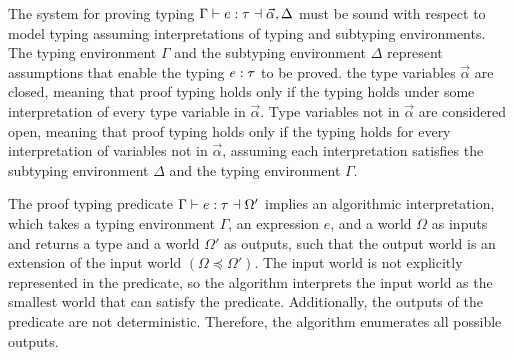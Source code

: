 \documentclass[acmsmall]{acmart}
\theoremstyle{definition}
\begin{document}
\noindent
The system for proving typing $\Gamma \vdash e : \tau \dashv \vec{\alpha}, \Delta$ 
must be sound with respect to model typing assuming 
interpretations of typing and subtyping environments.
The typing environment $\Gamma$ and the subtyping environment $\Delta$
represent assumptions that enable the typing $e : \tau$ to be proved. 
the type variables $\vec{\alpha}$ are closed, meaning that proof typing
holds only if the typing holds under some interpretation of every type variable in $\vec{\alpha}$.
Type variables not in $\vec{\alpha}$ are considered open, meaning that proof typing
holds only if the typing holds for every interpretation of variables not in $\vec{\alpha}$,
assuming each interpretation satisfies the subtyping environment $\Delta$ and the typing environment $\Gamma$.  

The proof typing predicate $\Gamma \vdash e : \tau \dashv \Omega'$
implies an algorithmic interpretation, 
which takes a typing environment $\Gamma$, an expression $e$,
and a world $\Omega$ as inputs and returns a type and a world $\Omega'$ as outputs,
such that the output world is an extension of the input world $(\Omega \preceq \Omega')$.
The input world is not explicitly represented in the predicate, so the algorithm
interprets the input world as the smallest world that can satisfy the predicate. 
Additionally, the outputs of the predicate are not deterministic. Therefore, the algorithm
enumerates all possible outputs.
\end{document}

